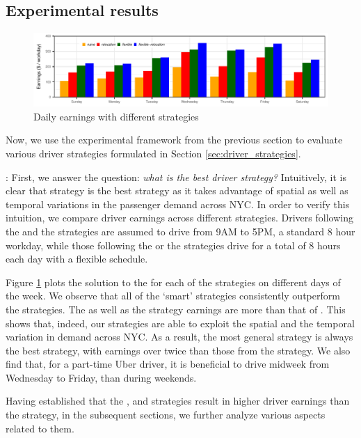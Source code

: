 \fi

\subsection{Experimental results}
\begin{figure}
	\centering
	\includegraphics{figures/daily_earnings.pdf}
	\caption{Daily earnings with different strategies}
	\label{fig:daily_earnings}
\end{figure}

Now, we use the experimental framework from the previous section to evaluate various driver strategies formulated in Section \ref{sec:driver_strategies}.

: First, we answer the question: \textit{what is the best driver strategy?} Intuitively, it is clear that {\relocationflexible} strategy is the best strategy as it takes advantage of spatial as well as temporal variations in the passenger demand across NYC. In order to verify this intuition, we compare driver earnings across different strategies. Drivers following the {\naive} and the {\relocation} strategies are assumed to drive from 9AM to 5PM, a standard 8 hour workday, while those following the {\flexible} or the {\relocationflexible} strategies drive for a total of 8 hours each day with a flexible schedule.

Figure \ref{fig:daily_earnings} plots the solution to the {\originalproblem} for each of the strategies on different days of the week. We observe that all of the `smart' strategies consistently outperform the {\naive} strategies. The {\relocation} as well as the {\flexible} strategy earnings are more than that of {\naive}. This shows that, indeed, our strategies are able to exploit the spatial and the temporal variation in demand across NYC. As a result, the most general {\relocationflexible} strategy is always the best strategy, with earnings over twice than those from the {\naive} strategy. We also find that, for a part-time Uber driver, it is beneficial to drive midweek from Wednesday to Friday, than during weekends.

Having established that the {\relocation}, {\flexible} and {\relocationflexible} strategies result in higher driver earnings than the {\naive} strategy, in the subsequent sections, we further analyze various aspects related to them.

